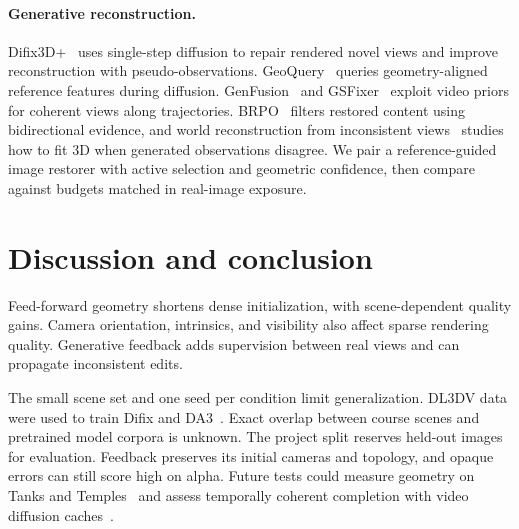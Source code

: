 \documentclass[10pt,twocolumn,letterpaper]{article}
\newif\ifpartthreeevidence
\begin{document}
\paragraph{Generative reconstruction.}
Difix3D+~\cite{wu2025difix} uses single-step diffusion to repair rendered novel views and improve reconstruction with pseudo-observations. GeoQuery~\cite{cao2026geoquery} queries geometry-aligned reference features during diffusion. GenFusion~\cite{wu2025genfusion} and GSFixer~\cite{yin2025gsfixer} exploit video priors for coherent views along trajectories. BRPO~\cite{zhao2026brpo} filters restored content using bidirectional evidence, and world reconstruction from inconsistent views~\cite{hollein2026world} studies how to fit 3D when generated observations disagree. We pair a reference-guided image restorer with active selection and geometric confidence, then compare against budgets matched in real-image exposure.




\section{Discussion and conclusion}
Feed-forward geometry shortens dense initialization, with scene-dependent quality gains. Camera orientation, intrinsics, and visibility also affect sparse rendering quality. Generative feedback adds supervision between real views and can propagate inconsistent edits.

\ifpartthreeevidence\partthreeconclusion\fi

The small scene set and one seed per condition limit generalization. DL3DV data were used to train Difix and DA3~\cite{wu2025difix,lin2025da3}. Exact overlap between course scenes and pretrained model corpora is unknown. The project split reserves held-out images for evaluation. Feedback preserves its initial cameras and topology, and opaque errors can still score high on alpha. Future tests could measure geometry on Tanks and Temples~\cite{knapitsch2017tanks} and assess temporally coherent completion with video diffusion caches~\cite{liu2025teacache,haghighi2026sencache}.

\onecolumn
\twocolumn
{\small
\setlength{\bibsep}{0pt}


}
\end{document}
